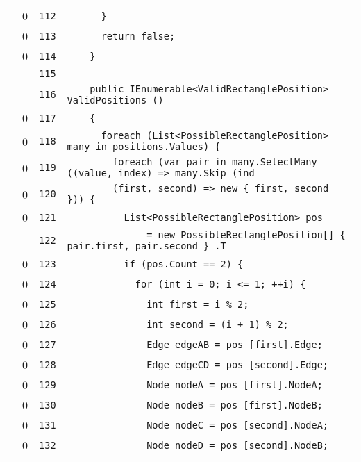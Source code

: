 \documentclass[a4paper,10pt]{article}
\begin{document}
\begin{longtable}[l]{lrrl}
\cellcolor{red} & 0 & \verb~112~ & \verb~      }~\\
\cellcolor{red} & 0 & \verb~113~ & \verb~      return false;~\\
\cellcolor{red} & 0 & \verb~114~ & \verb~    }~\\
\cellcolor{gray} &  & \verb~115~ & \verb~~\\
\cellcolor{gray} &  & \verb~116~ & \verb~    public IEnumerable<ValidRectanglePosition> ValidPositions ()~\\
\cellcolor{red} & 0 & \verb~117~ & \verb~    {~\\
\cellcolor{red} & 0 & \verb~118~ & \verb~      foreach (List<PossibleRectanglePosition> many in positions.Values) {~\\
\cellcolor{red} & 0 & \verb~119~ & \verb~        foreach (var pair in many.SelectMany ((value, index) => many.Skip (ind~\\
\cellcolor{red} & 0 & \verb~120~ & \verb~        (first, second) => new { first, second })) {~\\
\cellcolor{red} & 0 & \verb~121~ & \verb~          List<PossibleRectanglePosition> pos~\\
\cellcolor{gray} &  & \verb~122~ & \verb~              = new PossibleRectanglePosition[] { pair.first, pair.second } .T~\\
\cellcolor{red} & 0 & \verb~123~ & \verb~          if (pos.Count == 2) {~\\
\cellcolor{red} & 0 & \verb~124~ & \verb~            for (int i = 0; i <= 1; ++i) {~\\
\cellcolor{red} & 0 & \verb~125~ & \verb~              int first = i % 2;~\\
\cellcolor{red} & 0 & \verb~126~ & \verb~              int second = (i + 1) % 2;~\\
\cellcolor{red} & 0 & \verb~127~ & \verb~              Edge edgeAB = pos [first].Edge;~\\
\cellcolor{red} & 0 & \verb~128~ & \verb~              Edge edgeCD = pos [second].Edge;~\\
\cellcolor{red} & 0 & \verb~129~ & \verb~              Node nodeA = pos [first].NodeA;~\\
\cellcolor{red} & 0 & \verb~130~ & \verb~              Node nodeB = pos [first].NodeB;~\\
\cellcolor{red} & 0 & \verb~131~ & \verb~              Node nodeC = pos [second].NodeA;~\\
\cellcolor{red} & 0 & \verb~132~ & \verb~              Node nodeD = pos [second].NodeB;~\\

\end{longtable}
\end{document}
